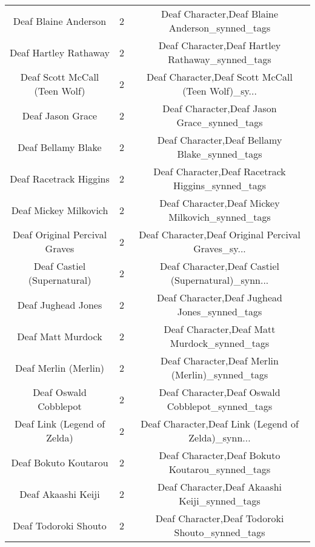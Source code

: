 \begin{table}[h!]
{\begin{tabular}{|c|c|c|}
                              Deaf Blaine Anderson &          2 &    Deaf Character,Deaf Blaine Anderson\_synned\_tags \\
                             Deaf Hartley Rathaway &          2 &   Deaf Character,Deaf Hartley Rathaway\_synned\_tags \\
                     Deaf Scott McCall (Teen Wolf) &          2 & Deaf Character,Deaf Scott McCall (Teen Wolf)\_sy... \\
                                  Deaf Jason Grace &          2 &        Deaf Character,Deaf Jason Grace\_synned\_tags \\
                                Deaf Bellamy Blake &          2 &      Deaf Character,Deaf Bellamy Blake\_synned\_tags \\
                            Deaf Racetrack Higgins &          2 &  Deaf Character,Deaf Racetrack Higgins\_synned\_tags \\
                             Deaf Mickey Milkovich &          2 &   Deaf Character,Deaf Mickey Milkovich\_synned\_tags \\
                     Deaf Original Percival Graves &          2 & Deaf Character,Deaf Original Percival Graves\_sy... \\
                       Deaf Castiel (Supernatural) &          2 & Deaf Character,Deaf Castiel (Supernatural)\_synn... \\
                                Deaf Jughead Jones &          2 &      Deaf Character,Deaf Jughead Jones\_synned\_tags \\
                                 Deaf Matt Murdock &          2 &       Deaf Character,Deaf Matt Murdock\_synned\_tags \\
                              Deaf Merlin (Merlin) &          2 &    Deaf Character,Deaf Merlin (Merlin)\_synned\_tags \\
                             Deaf Oswald Cobblepot &          2 &   Deaf Character,Deaf Oswald Cobblepot\_synned\_tags \\
                       Deaf Link (Legend of Zelda) &          2 & Deaf Character,Deaf Link (Legend of Zelda)\_synn... \\
                              Deaf Bokuto Koutarou &          2 &    Deaf Character,Deaf Bokuto Koutarou\_synned\_tags \\
                                Deaf Akaashi Keiji &          2 &      Deaf Character,Deaf Akaashi Keiji\_synned\_tags \\
                              Deaf Todoroki Shouto &          2 &    Deaf Character,Deaf Todoroki Shouto\_synned\_tags \\

\end{tabular}}
\end{table}
